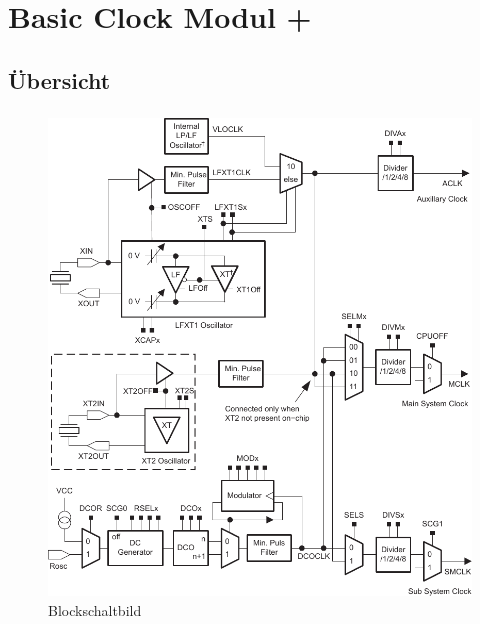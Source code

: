 
\section{Basic Clock Modul +}

\subsection{Übersicht}
\begin{frame}
\frametitle{}
\framesubtitle{}
  \begin{figure}
    \includegraphics[width=0.5\columnwidth]{fig/ti_fg_bcm_block.pdf}
    \caption{Blockschaltbild}
  \end{figure}
\end{frame}


